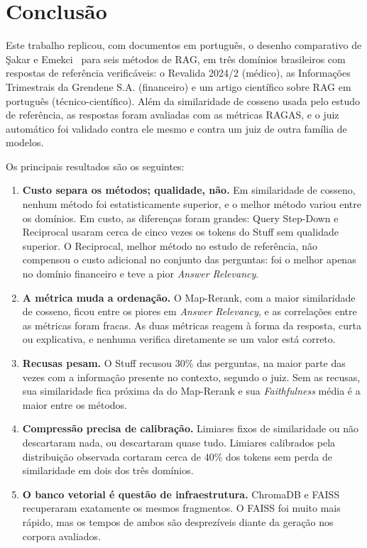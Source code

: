 \section{Conclusão}
\label{sc:conclusao}

Este trabalho replicou, com documentos em português, o desenho comparativo de Şakar e Emekci~\cite{sakar2025rag} para seis métodos de RAG, em três domínios brasileiros com respostas de referência verificáveis: o Revalida 2024/2 (médico), as Informações Trimestrais da Grendene S.A. (financeiro) e um artigo científico sobre RAG em português (técnico-científico). Além da similaridade de cosseno usada pelo estudo de referência, as respostas foram avaliadas com as métricas RAGAS, e o juiz automático foi validado contra ele mesmo e contra um juiz de outra família de modelos.

Os principais resultados são os seguintes:

\begin{enumerate}
  \item \textbf{Custo separa os métodos; qualidade, não.} Em similaridade de cosseno, nenhum método foi estatisticamente superior, e o melhor método variou entre os domínios. Em custo, as diferenças foram grandes: Query Step-Down e Reciprocal usaram cerca de cinco vezes os tokens do Stuff sem qualidade superior. O Reciprocal, melhor método no estudo de referência, não compensou o custo adicional no conjunto das perguntas: foi o melhor apenas no domínio financeiro e teve a pior \emph{Answer Relevancy}.
  \item \textbf{A métrica muda a ordenação.} O Map-Rerank, com a maior similaridade de cosseno, ficou entre os piores em \emph{Answer Relevancy}, e as correlações entre as métricas foram fracas. As duas métricas reagem à forma da resposta, curta ou explicativa, e nenhuma verifica diretamente se um valor está correto.
  \item \textbf{Recusas pesam.} O Stuff recusou 30\% das perguntas, na maior parte das vezes com a informação presente no contexto, segundo o juiz. Sem as recusas, sua similaridade fica próxima da do Map-Rerank e sua \emph{Faithfulness} média é a maior entre os métodos.
  \item \textbf{Compressão precisa de calibração.} Limiares fixos de similaridade ou não descartaram nada, ou descartaram quase tudo. Limiares calibrados pela distribuição observada cortaram cerca de 40\% dos tokens sem perda de similaridade em dois dos três domínios.
  \item \textbf{O banco vetorial é questão de infraestrutura.} ChromaDB e FAISS recuperaram exatamente os mesmos fragmentos. O FAISS foi muito mais rápido, mas os tempos de ambos são desprezíveis diante da geração nos corpora avaliados.
\end{enumerate}

